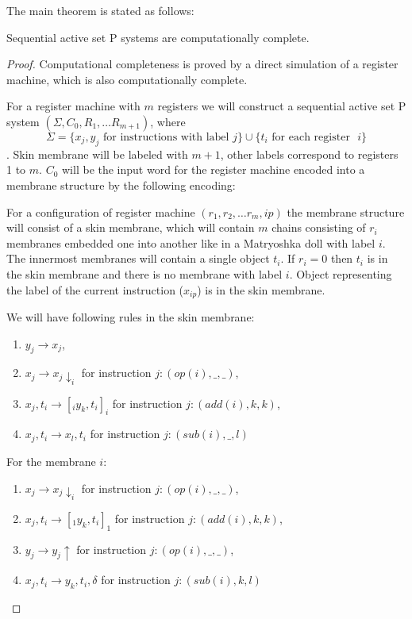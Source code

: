 \documentclass[submission,copyright,creativecommons]{../lib/lncs/llncs}
\begin{document}
The main theorem is stated as follows:

\begin{theorem}
  Sequential active set P systems are computationally complete.
\end{theorem}

\begin{proof}
  Computational completeness is proved by a direct simulation of a register machine, which is also computationally complete.

  For a register machine with $m$ registers we will construct a sequential active set P system $(\Sigma, C_0, R_1, \ldots R_{m+1})$, where $$\Sigma = \{x_j, y_j \text{~for instructions with label~} j\}\cup\{t_i \text{~for each register ~}i\}$$. Skin membrane will be labeled with $m+1$, other labels correspond to registers 1 to $m$. $C_0$ will be the input word for the register machine encoded into a membrane structure by the following encoding: 

  For a configuration of register machine $(r_1, r_2, \ldots r_m, ip)$ the membrane structure will consist of a skin membrane, which will contain $m$ chains consisting of $r_i$ membranes embedded one into another like in a Matryoshka doll with label $i$. The innermost membranes will contain a single object $t_i$. If $r_i = 0$ then $t_i$ is in the skin membrane and there is no membrane with label $i$. Object representing the label of the current instruction ($x_{ip}$) is in the skin membrane.

  We will have following rules in the skin membrane:
  \begin{enumerate}
    \item\label{simple_skin_next_instruction} $y_j \rightarrow x_j$,
    \item\label{simple_skin_send_down} $x_j \rightarrow x_j\downarrow_{i}$ for instruction $j: (op(i), \_, \_)$,
    \item\label{simple_skin_create} $x_j, t_i \rightarrow [_i y_k, t_i ]_i$ for instruction $j: (add(i), k, k)$,
    \item\label{simple_skin_sub_empty} $x_j, t_i \rightarrow x_l, t_i$ for instruction $j: (sub(i), \_, l)$
  \end{enumerate}

  For the membrane $i$:
  \begin{enumerate}[resume]
    \item\label{simple_inner_resend_down} $x_j \rightarrow x_j\downarrow_{i}$ for instruction $j: (op(i), \_, \_)$,
    \item\label{simple_inner_create} $x_j, t_i \rightarrow [_1 y_k, t_i ]_1$ for instruction $j: (add(i), k, k)$,
    \item\label{simple_inner_resend_up} $y_j \rightarrow y_j\uparrow$ for instruction $j: (op(i), \_, \_)$,
    \item\label{simple_inner_dissolve} $x_j, t_i \rightarrow y_k, t_i, \delta$ for instruction $j: (sub(i), k, l)$
  \end{enumerate}


\end{proof}
\end{document}
